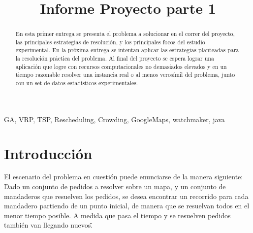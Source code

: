\documentclass[9pt,conference]{IEEEtran}
\begin{document}
	\title{Informe Proyecto parte 1}
	\author{
		\and
	}



	\maketitle

	\begin{abstract}
	En esta primer entrega se presenta el problema a solucionar en el correr del proyecto, las principales estrategias de resolución, y los principales focos del estudio experimental.
	En la próxima entrega se intentan aplicar las estrategias planteadas para la resolución práctica del problema. Al final del proyecto se espera lograr una aplicación que logre con recursos computacionales no demasiados elevados y en un tiempo razonable resolver una instancia real o al menos verosímil del problema, junto con un set de datos estadísticos experimentales.
	\end{abstract}
	\begin{IEEEkeywords}
	GA, VRP, TSP, Rescheduling, Crowding, GoogleMaps, watchmaker, java 
	\end{IEEEkeywords}

	\section{Introducción}

	El escenario del problema en cuestión puede enunciarse de la manera siguiente:
	\"Dado un conjunto de pedidos a resolver sobre un mapa, y un conjunto de mandaderos que resuelven los pedidos, se desea encontrar un recorrido para cada mandadero partiendo de un punto inicial, de manera que se resuelvan todos en el menor tiempo posible. A medida que pasa el tiempo y se resuelven pedidos también van llegando nuevos.\"
\end{document}
